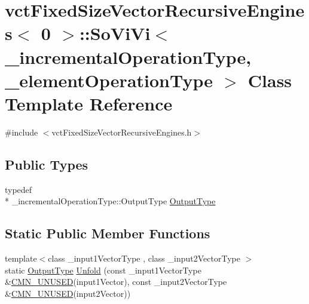 \hypertarget{classvct_fixed_size_vector_recursive_engines_3_010_01_4_1_1_so_vi_vi}{\section{vct\-Fixed\-Size\-Vector\-Recursive\-Engines$<$ 0 $>$\-:\-:So\-Vi\-Vi$<$ \-\_\-incremental\-Operation\-Type, \-\_\-element\-Operation\-Type $>$ Class Template Reference}
\label{classvct_fixed_size_vector_recursive_engines_3_010_01_4_1_1_so_vi_vi}
}


{\ttfamily \#include $<$vct\-Fixed\-Size\-Vector\-Recursive\-Engines.\-h$>$}

\subsection*{Public Types}
\begin{DoxyCompactItemize}
\item 
typedef \\*
\-\_\-incremental\-Operation\-Type\-::\-Output\-Type \hyperlink{classvct_fixed_size_vector_recursive_engines_3_010_01_4_1_1_so_vi_vi_a0bad367055cb0c9d0e6c3f5521b0463b}{Output\-Type}
\end{DoxyCompactItemize}
\subsection*{Static Public Member Functions}
\begin{DoxyCompactItemize}
\item 
{\footnotesize template$<$class \-\_\-input1\-Vector\-Type , class \-\_\-input2\-Vector\-Type $>$ }\\static \hyperlink{classvct_fixed_size_vector_recursive_engines_3_010_01_4_1_1_so_vi_vi_a0bad367055cb0c9d0e6c3f5521b0463b}{Output\-Type} \hyperlink{classvct_fixed_size_vector_recursive_engines_3_010_01_4_1_1_so_vi_vi_a86320bb2a18ee270b0b10cfe7fe6a4e4}{Unfold} (const \-\_\-input1\-Vector\-Type \&\hyperlink{cmn_portability_8h_a021894e2626935fa2305434b1e893ff6}{C\-M\-N\-\_\-\-U\-N\-U\-S\-E\-D}(input1\-Vector), const \-\_\-input2\-Vector\-Type \&\hyperlink{cmn_portability_8h_a021894e2626935fa2305434b1e893ff6}{C\-M\-N\-\_\-\-U\-N\-U\-S\-E\-D}(input2\-Vector))
\end{DoxyCompactItemize}


